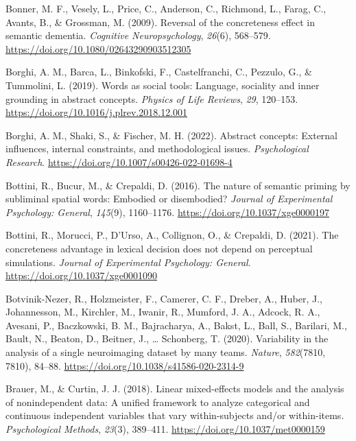 \documentclass[
  12pt,
  man,floatsintext]{apa7}
\newlength{\cslhangindent}
\newlength{\cslentryspacingunit} %
\newenvironment{CSLReferences}[2] %
 {%
  \setlength{\parindent}{0pt}
  \ifodd #1
  \let\oldpar\par
  \def\par{\hangindent=\cslhangindent\oldpar}
  \fi
  \setlength{\parskip}{#2\cslentryspacingunit}
 }%
 {}
\begin{document}
\begin{CSLReferences}{1}{0}
\leavevmode{}%
Bonner, M. F., Vesely, L., Price, C., Anderson, C., Richmond, L., Farag, C., Avants, B., \& Grossman, M. (2009). Reversal of the concreteness effect in semantic dementia. \emph{Cognitive Neuropsychology}, \emph{26}(6), 568--579. \url{https://doi.org/10.1080/02643290903512305}

\leavevmode{}%
Borghi, A. M., Barca, L., Binkofski, F., Castelfranchi, C., Pezzulo, G., \& Tummolini, L. (2019). Words as social tools: {Language}, sociality and inner grounding in abstract concepts. \emph{Physics of Life Reviews}, \emph{29}, 120--153. \url{https://doi.org/10.1016/j.plrev.2018.12.001}

\leavevmode{}%
Borghi, A. M., Shaki, S., \& Fischer, M. H. (2022). Abstract concepts: External influences, internal constraints, and methodological issues. \emph{Psychological Research}. \url{https://doi.org/10.1007/s00426-022-01698-4}

\leavevmode{}%
Bottini, R., Bucur, M., \& Crepaldi, D. (2016). The nature of semantic priming by subliminal spatial words: {Embodied} or disembodied? \emph{Journal of Experimental Psychology: General}, \emph{145}(9), 1160--1176. \url{https://doi.org/10.1037/xge0000197}

\leavevmode{}%
Bottini, R., Morucci, P., D'Urso, A., Collignon, O., \& Crepaldi, D. (2021). The concreteness advantage in lexical decision does not depend on perceptual simulations. \emph{Journal of Experimental Psychology: General}. \url{https://doi.org/10.1037/xge0001090}

\leavevmode{}%
Botvinik-Nezer, R., Holzmeister, F., Camerer, C. F., Dreber, A., Huber, J., Johannesson, M., Kirchler, M., Iwanir, R., Mumford, J. A., Adcock, R. A., Avesani, P., Baczkowski, B. M., Bajracharya, A., Bakst, L., Ball, S., Barilari, M., Bault, N., Beaton, D., Beitner, J., \ldots{} Schonberg, T. (2020). Variability in the analysis of a single neuroimaging dataset by many teams. \emph{Nature}, \emph{582}(7810, 7810), 84--88. \url{https://doi.org/10.1038/s41586-020-2314-9}

\leavevmode{}%
Brauer, M., \& Curtin, J. J. (2018). Linear mixed-effects models and the analysis of nonindependent data: {A} unified framework to analyze categorical and continuous independent variables that vary within-subjects and/or within-items. \emph{Psychological Methods}, \emph{23}(3), 389--411. \url{https://doi.org/10.1037/met0000159}


\end{CSLReferences}
\end{document}
